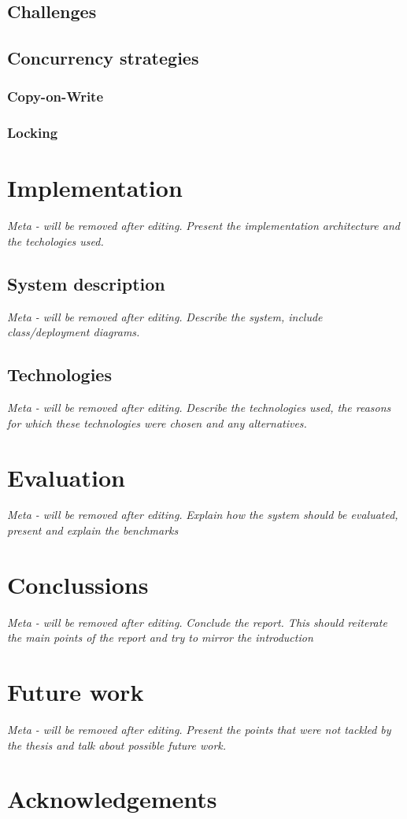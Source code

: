 \documentclass[11pt,a4paper]{globis-book}
\begin{document}
\section{Challenges}
\section{Concurrency strategies}
\subsection{Copy-on-Write}
\subsection{Locking}

\chapter{Implementation}
\textit{Meta - will be removed after editing.}
\textit{Present the implementation architecture and the techologies used.}
\section{System description}
\textit{Meta - will be removed after editing.}
\textit{Describe the system, include class/deployment diagrams.}
\section{Technologies}
\textit{Meta - will be removed after editing.}
\textit{Describe the technologies used, the reasons for which these technologies were chosen and any alternatives.}

\chapter{Evaluation}
\textit{Meta - will be removed after editing.}
\textit{Explain how the system should be evaluated, present and explain the benchmarks}
\chapter{Conclussions}

\textit{Meta - will be removed after editing.}
\textit{Conclude the report. This should reiterate the main points of the report and try to mirror the introduction}
\chapter{Future work}

\textit{Meta - will be removed after editing.}
\textit{Present the points that were not tackled by the thesis and talk about possible future work.}

\appendix

\listoffigures
\listoftables

\chapter*{Acknowledgements}

\newpage
\thispagestyle{empty}



\end{document}
